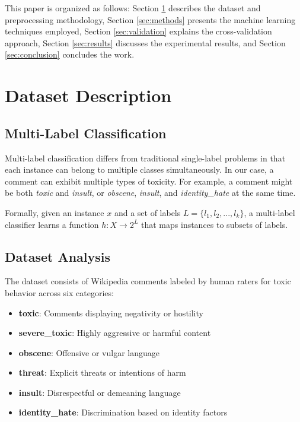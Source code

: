 \documentclass[conference]{IEEEtran}
\begin{document}
This paper is organized as follows: Section \ref{sec:dataset} describes the dataset and preprocessing methodology, Section \ref{sec:methods} presents the machine learning techniques employed, Section \ref{sec:validation} explains the cross-validation approach, Section \ref{sec:results} discusses the experimental results, and Section \ref{sec:conclusion} concludes the work.

\section{Dataset Description}
\label{sec:dataset}

\subsection{Multi-Label Classification}

Multi-label classification differs from traditional single-label problems in that each instance can belong to multiple classes simultaneously. In our case, a comment can exhibit multiple types of toxicity. For example, a comment might be both \textit{toxic} and \textit{insult}, or \textit{obscene}, \textit{insult}, and \textit{identity\_hate} at the same time.

Formally, given an instance $x$ and a set of labels $L = \{l_1, l_2, ..., l_k\}$, a multi-label classifier learns a function $h: X \rightarrow 2^L$ that maps instances to subsets of labels.

\subsection{Dataset Analysis}

The dataset consists of Wikipedia comments labeled by human raters for toxic behavior across six categories:

\begin{itemize}
    \item \textbf{toxic}: Comments displaying negativity or hostility
    \item \textbf{severe\_toxic}: Highly aggressive or harmful content
    \item \textbf{obscene}: Offensive or vulgar language
    \item \textbf{threat}: Explicit threats or intentions of harm
    \item \textbf{insult}: Disrespectful or demeaning language
    \item \textbf{identity\_hate}: Discrimination based on identity factors
\end{itemize}
\end{document}
